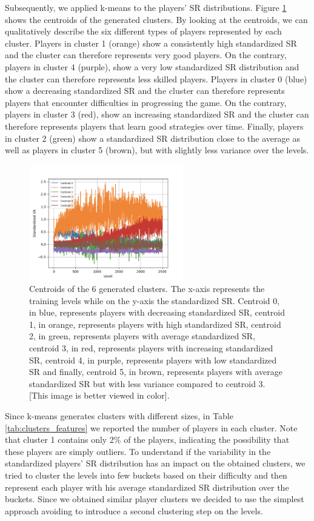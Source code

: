Subsequently, we applied k-means to the players' SR distributions. Figure \ref{fig:k_means} shows the centroids of the generated clusters. By looking at the centroids, we can qualitatively describe the six different types of players represented by each cluster. Players in cluster 1 (orange) show a consistently high standardized SR and the cluster can therefore represents very good players. On the contrary, players in cluster 4 (purple), show a very low standardized SR distribution and the cluster can therefore represents less skilled players. 
Players in cluster 0 (blue) show a decreasing standardized SR and the cluster can therefore represents players that encounter difficulties in progressing the game. On the contrary, players in cluster 3 (red), show an increasing standardized SR and the cluster can therefore represents players that learn good strategies over time. Finally, players in cluster 2 (green) show a standardized SR distribution close to the average as well as players in cluster 5 (brown), but with slightly less variance over the levels.
\begin{figure}[h]
  \centering
    \includegraphics[width=0.6\textwidth]{masters-thesis-master/masters-thesis/contents/04_results/clustering_players_images/centroids_6_clusters.png}
    \caption{Centroids of the 6 generated clusters. The x-axis represents the training levels while on the y-axis the standardized SR. Centroid 0, in blue, represents players with decreasing standardized SR, centroid 1, in orange, represents players with high standardized SR, centroid 2, in green, represents players with average standardized SR, centroid 3, in red, represents players with increasing standardized SR, centroid 4, in purple, represents players with low standardized SR and finally, centroid 5, in brown, represents players with average standardized SR but with less variance compared to centroid 3. [This image is better viewed in color].
    }
    \label{fig:k_means}
\end{figure}
Since k-means generates clusters with different sizes, in Table \ref{tab:clusters_features} we reported the number of players in each cluster. Note that cluster 1 contains only 2\% of the players, indicating the possibility that these players are simply outliers. To understand if the variability in the standardized players' SR distribution has an impact on the obtained clusters, we tried to cluster the levels into few buckets based on their difficulty and then represent each player with his average standardized SR distribution over the buckets. Since we obtained similar player clusters we decided to use the simplest approach avoiding to introduce a second clustering step on the levels.


